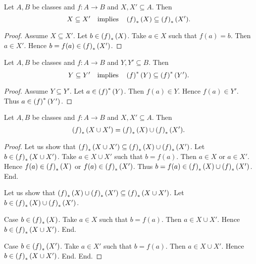 \documentclass[../../set-theory/set-theory.tex]{subfiles}
\begin{document}
  \begin{forthel}
    \begin{proposition}
      Let $A, B$ be classes and $f : A \to B$ and $X, X' \subseteq A$.
      Then \[ X \subseteq X' \quad \text{implies} \quad \left(f\right)_{*}(X) \subseteq \left(f\right)_{*}(X'). \]
    \end{proposition}
    \begin{proof}
      Assume $X \subseteq X'$.
      Let $b \in \left(f\right)_{*}(X)$.
      Take $a \in X$ such that $f(a) = b$.
      Then $a \in X'$.
      Hence $b = f(a) \in \left(f\right)_{*}(X')$.
    \end{proof}
  \end{forthel}

  \begin{forthel}
    \begin{proposition}
      Let $A, B$ be classes and $f : A \to B$ and $Y, Y' \subseteq B$.
      Then \[ Y \subseteq Y' \quad \text{implies} \quad \left(f\right)^{*}(Y) \subseteq \left(f\right)^{*}(Y'). \]
    \end{proposition}
    \begin{proof}
      Assume $Y \subseteq Y'$.
      Let $a \in \left(f\right)^{*}(Y)$.
      Then $f(a) \in Y$.
      Hence $f(a) \in Y'$.
      Thus $a \in \left(f\right)^{*}(Y')$.
    \end{proof}
  \end{forthel}

  \begin{forthel}
    \begin{proposition}
      Let $A, B$ be classes and $f : A \to B$ and $X, X' \subseteq A$.
      Then \[ \left(f\right)_{*}(X \cup X') = \left(f\right)_{*}(X) \cup \left(f\right)_{*}(X'). \]
    \end{proposition}
    \begin{proof}
      Let us show that $\left(f\right)_{*}(X \cup X') \subseteq \left(f\right)_{*}(X) \cup \left(f\right)_{*}(X')$.
        Let $b \in \left(f\right)_{*}(X \cup X')$.
        Take $a \in X \cup X'$ such that $b = f(a)$.
        Then $a \in X$ or $a \in X'$.
        Hence $f(a) \in \left(f\right)_{*}(X)$ or $f(a) \in \left(f\right)_{*}(X')$.
        Thus $b = f(a) \in \left(f\right)_{*}(X) \cup \left(f\right)_{*}(X')$.
      End.

      Let us show that $\left(f\right)_{*}(X) \cup \left(f\right)_{*}(X') \subseteq \left(f\right)_{*}(X \cup X')$.
        Let $b \in \left(f\right)_{*}(X) \cup \left(f\right)_{*}(X')$.

        Case $b \in \left(f\right)_{*}(X)$.
          Take $a \in X$ such that $b = f(a)$.
          Then $a \in X \cup X'$.
          Hence $b \in \left(f\right)_{*}(X \cup X')$.
        End.

        Case $b \in \left(f\right)_{*}(X')$.
          Take $a \in X'$ such that $b = f(a)$.
          Then $a \in X \cup X'$.
          Hence $b \in \left(f\right)_{*}(X \cup X')$.
        End.
      End.
    \end{proof}
  \end{forthel}
\end{document}
